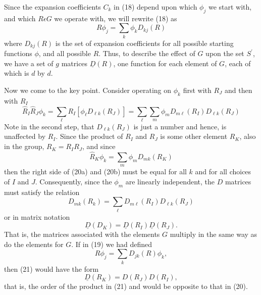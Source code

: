 Since  the expansion coefficients $C_k$ in (18) depend upon which 
$\phi_j$ we start with, and which $R \epsilon G$ we operate with, we 
will rewrite (18) as
\begin{equation}
R \phi_j = \sum_{k} \phi_k D_{kj}(R)
\label{chap16-eqno19}
\end{equation}
where $D_{kj}(R)$ is the set of expansion coefficients for all 
possible starting functions $\phi$, and all possible $R$.  Thus, to 
describe the effect of $G$ upon the set $S^{\prime}$, we have a set 
of $g$ matrices $\underline{D}(R)$, one function for each element of 
$G$, each of which is $d$ by $d$.

Now we come to the key point.  Consider operating on $\phi_k$ first 
with $R_J$ and then with $R_I$
\begin{equation}
{\hat{R}}_I {\hat{R}}_J \phi_k = \sum_{\ell} R_I \left[ \phi_{\ell} 
D_{\ell k} (R_J)\right] = \sum_{\ell} \sum_{m} \phi_m D_{m \ell} 
(R_I)D_{\ell k}(R_J)
\label{chap16-eqno20a}
\end{equation}
Note in the second step, that $D_{\ell k}(R_J)$ is just a number and 
hence, is unaffected by $R_I$.  Since the product of $R_I$ and $R_J$ 
is some other element $R_K$, also in the group, $R_K = R_IR_J$, and 
since
\begin{equation}
{\hat{R}}_K \phi_k = \sum_{m} \phi_m D_{mk} \left( R_K \right)
\label{chap16-eqno20b}
\end{equation}
then the right side of (20a) and (20b) must be equal for all $k$ and 
for all choices of $I$ and $J$.  Consequently, since the $\phi_m$ are 
linearly independent, the $D$ matrices must satisfy the relation
\begin{equation}
D_{mk} \left( R_k \right) = \sum_{\ell} D_{m \ell} \left( R_I \right) 
D_{\ell k} (R_J)
\label{chap16-eqno21a}
\end{equation}
or in matrix notation
\begin{equation}
\underline{D} \left( D_K \right) = \underline{D} \left( R_I \right) \underline{D} 
\left( R_J \right).
\label{chap16-eqno21b}
\end{equation}
That is, the matrices associated with the elements $G$ multiply in 
the same way as do the elements for $G$.  If in (19) we had defined
\begin{equation}
R \phi_j = \sum_{k} D_{jk} (R) \phi_k,
\end{equation}
then (21) would have the form
\begin{equation}
\underline{D} \left( R_K \right) = D \left( R_J \right) D \left( R_I 
\right),
\end{equation}
that is, the order of the product in (21) and would be opposite to 
that in (20).

